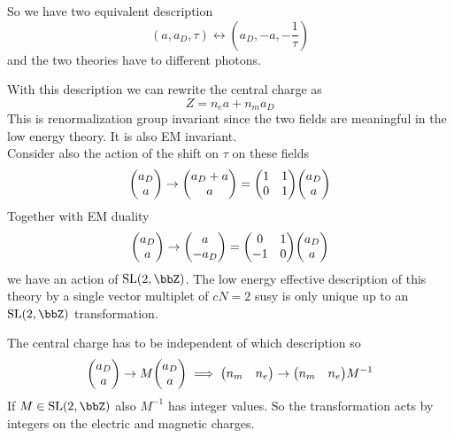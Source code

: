 \documentclass[11pt]{article}
\theoremstyle{definition}
\numberwithin{equation}{section}
\newcommand*\SL{\mathrm{SL}}
\begin{document}
So we have two equivalent description 
\begin{equation}
	(a,a_{D},\tau)\leftrightarrow (a_{D},-a,-\frac{1}{\tau})
\end{equation}
and the two theories have to different photons.

With this description we can rewrite the central charge as
\begin{equation}
	Z=n_{e}a+n_{m}a_{D}
\end{equation}
This is renormalization group invariant since the two fields are meaningful in the low energy theory. It is also EM invariant.\\
Consider also the action of the shift on $\tau$ on these fields
\begin{equation}
	\mqty(a_{D}\\a)\rightarrow \mqty(a_{D}+a\\a)=\mqty(1&1\\0&1)\mqty(a_{D}\\a)
\end{equation}
Together with EM duality
\begin{equation}
	\mqty(a_{D}\\a)\rightarrow \mqty(a\\-a_{D})=\mqty(0&1\\-1&0)\mqty(a_{D}\\a)
\end{equation}
we have an action of $\SL(2,\bbZ)$. The low energy effective description of this theory by a single vector multiplet of $cN=2$ susy is only unique up to an $\SL(2,\bbZ)$ transformation.

The central charge has to be independent of which description so
\begin{equation}
	\mqty(a_{D}\\a)\rightarrow M\mqty(a_{D}\\a)\implies \mqty(n_{m}&n_{e})\rightarrow \mqty(n_{m}&n_{e})M^{-1}
\end{equation}
If $M\in\SL(2,\bbZ)$ also $M^{-1}$ has integer values. So the transformation acts by integers on the electric and magnetic charges.
\end{document}
